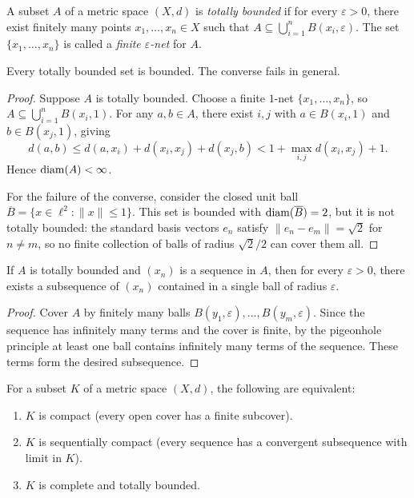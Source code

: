 \documentclass[11pt,a4paper]{article}
\begin{document}
\begin{definition}
\label{def:totally_bounded}
A subset $A$ of a metric space $(X,d)$ is \emph{totally bounded} if for every
$\varepsilon > 0$, there exist finitely many points $x_1, \ldots, x_n \in X$
such that $A \subseteq \bigcup_{i=1}^n B(x_i, \varepsilon)$. The set
$\{x_1, \ldots, x_n\}$ is called a \emph{finite $\varepsilon$-net} for $A$.
\end{definition}

\begin{proposition}
\label{prop:tb_bounded}
Every totally bounded set is bounded. The converse fails in general.
\end{proposition}

\begin{proof}
Suppose $A$ is totally bounded. Choose a finite $1$-net
$\{x_1, \ldots, x_n\}$, so $A \subseteq \bigcup_{i=1}^n B(x_i, 1)$. For
any $a, b \in A$, there exist $i, j$ with $a \in B(x_i, 1)$ and
$b \in B(x_j, 1)$, giving
\[
d(a,b) \le d(a, x_i) + d(x_i, x_j) + d(x_j, b)
< 1 + \max_{i,j} d(x_i, x_j) + 1.
\]
Hence $\operatorname{diam}(A) < \infty$.

For the failure of the converse, consider the closed unit ball $\overline{B}
= \{x \in \ell^2 : \|x\| \le 1\}$. This set is bounded with $\operatorname{diam}(\overline
{B}) = 2$, but it is not totally bounded: the standard basis vectors
$e_n$ satisfy $\|e_n - e_m\| = \sqrt{2}$ for $n \ne m$, so no finite
collection of balls of radius $\sqrt{2}/2$ can cover them all.
\end{proof}

\begin{lemma}
\label{lem:tb_subsequence}
If $A$ is totally bounded and $(x_n)$ is a sequence in $A$, then for every
$\varepsilon > 0$, there exists a subsequence of $(x_n)$ contained in a
single ball of radius $\varepsilon$.
\end{lemma}

\begin{proof}
Cover $A$ by finitely many balls $B(y_1, \varepsilon), \ldots,
B(y_m, \varepsilon)$. Since the sequence has infinitely many terms and
the cover is finite, by the pigeonhole principle at least one ball contains
infinitely many terms of the sequence. These terms form the desired
subsequence.
\end{proof}

\begin{theorem}
\label{thm:compact_equiv}
For a subset $K$ of a metric space $(X,d)$, the following are equivalent:
\begin{enumerate}[nosep,label=(\roman*)]
    \item $K$ is compact (every open cover has a finite subcover).
    \item $K$ is sequentially compact (every sequence has a convergent
          subsequence with limit in $K$).
    \item $K$ is complete and totally bounded.
\end{enumerate}
\end{theorem}
\end{document}

